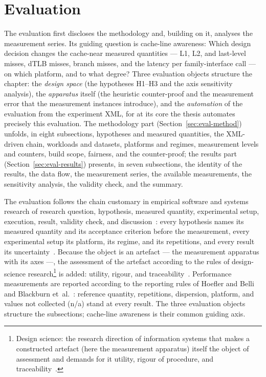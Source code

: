 \chapter{Evaluation}\label{ch:eval}

\begin{nurlang}
The evaluation first discloses the methodology and, building on it, analyses the measurement series. Its
guiding question is cache-line awareness: Which design decision changes the cache-near measured
quantities --- L1, L2, and last-level misses, dTLB misses, branch misses, and the latency per
family-interface call --- on which platform, and to what degree? Three evaluation objects structure the
chapter: the \emph{design space} (the hypotheses H1--H3 and the axis sensitivity analysis), the
\emph{apparatus} itself (the heuristic counter-proof and the measurement error that the measurement
instances introduce), and the \emph{automation} of the evaluation from the experiment XML, for at its
core the thesis automates precisely this evaluation. The methodology part (Section~\ref{sec:eval-method})
unfolds, in eight subsections, hypotheses and measured quantities, the XML-driven chain, workloads and
datasets, platforms and regimes, measurement levels and counters, build scope, fairness, and the
counter-proof; the results part (Section~\ref{sec:eval-results}) presents, in seven subsections, the
identity of the results, the data flow, the measurement series, the available measurements, the
sensitivity analysis, the validity check, and the summary.

The evaluation follows the chain customary in empirical software and systems research of research
question, hypothesis, measured quantity, experimental setup, execution, result, validity check, and
discussion~\cite{wohlin2012experimentation,shaw2003writing}: every hypothesis names its measured
quantity and its acceptance criterion before the measurement, every experimental setup its platform,
its regime, and its repetitions, and every result its
uncertainty~\cite{georges2007rigorous,kalibera2013rigorous}. Because the object is an artefact ---
the measurement apparatus with its axes ---, the assessment of the artefact according to the rules of
design-science research\footnote{Design science: the research direction of information systems that
makes a constructed artefact (here the measurement apparatus) itself the object of assessment and
demands for it utility, rigour of procedure, and traceability~\cite{hevner2004designscience}.}
is added: utility, rigour, and
traceability~\cite{hevner2004designscience,peffers2007dsrm,wieringa2014designscience}.
Performance measurements are reported according to the reporting rules of Hoefler and
Belli~\cite{hoefler2015benchmarking} and Blackburn et~al.~\cite{blackburn2016truth}: reference
quantity, repetitions, dispersion, platform, and values not collected (n/a) stand at every result. The
three evaluation objects structure the subsections; cache-line awareness is their common guiding axis.


\end{nurlang}
